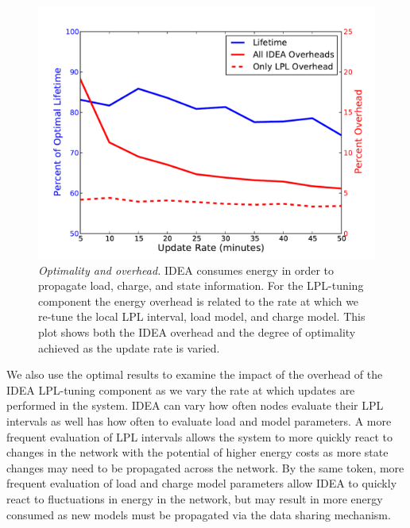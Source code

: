 \documentclass{sig-alternate}
\begin{document}
\begin{figure}[t]
\begin{center}
\includegraphics[width=\hsize]{./figs/graph_update_rate_overhead.pdf}
\end{center}

\caption{\textit{Optimality and overhead.} IDEA consumes energy in order to
propagate load, charge, and state information. For the LPL-tuning component
the energy overhead is related to the rate at which we re-tune the local LPL
interval, load model, and charge model. This plot shows both the IDEA
overhead and the degree of optimality achieved as the update rate is varied.}

\label{fig-lploverhead}
\end{figure}

We also use the optimal results to examine the impact of the overhead of the
IDEA LPL-tuning component as we vary the rate at which updates are performed
in the system. IDEA can vary how often nodes evaluate their LPL intervals as
well has how often to evaluate load and model parameters. A more frequent
evaluation of LPL intervals allows the system to more quickly react to
changes in the network with the potential of higher energy costs as more
state changes may need to be propagated across the network. By the same
token, more frequent evaluation of load and charge model parameters allow
IDEA to quickly react to fluctuations in energy in the network, but may
result in more energy consumed as new models must be propagated via the data
sharing mechanism.

\vfill\eject
\end{document}
